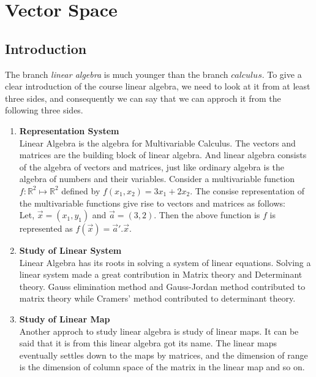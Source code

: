 \documentclass[aima104_lecturenotes_ku.tex]{subfiles}
\begin{document}
\chapter{Vector Space}
\section{Introduction}
The branch \textit{linear algebra} is much younger than the branch $calculus$. To give a clear introduction of the course linear algebra, we need to look at it from at least three sides, and consequently we can say that we can approch it from the following three sides.
\begin{enumerate}
\item \textbf{Representation System} \\[1mm]
  Linear Algebra is the algebra for Multivariable Calculus. The vectors and matrices are the building block of linear algebra. And linear algebra consists of the algebra of vectors and matrices, just like ordinary algebra is the algebra of numbers and their variables. Consider a multivariable function $f: \mathbb{R}^2 \mapsto \mathbb{R}^2$ defined by $f(x_1, x_2) = 3x_1 + 2x_2$. The consise representation of the multivariable functions give rise to vectors and matrices as follows: \\
  Let, $\vec{x} = (x_1,y_1)$ and $\vec{a} = (3,2)$. Then the above function is $f$ is represented as $f(\vec{x})=\vec{a}'.\vec{x}$.

\item \textbf{Study of Linear System} \\[1mm]
  Linear Algebra has its roots in solving a system of linear equations.
  Solving a linear system made a great contribution in Matrix theory and Determinant theory. Gauss elimination method and Gauss-Jordan method contributed to matrix theory while Cramers' method contributed to determinant theory.

\item \textbf{Study of Linear Map} \\[1mm]
  Another approch to study linear algebra is study of linear maps. It can be said that it is from this linear algebra got its name. The linear maps eventually settles down to the maps by matrices, and the dimension of range is the dimension of column space of the matrix in the linear map and so on.
\end{enumerate}
\end{document}

